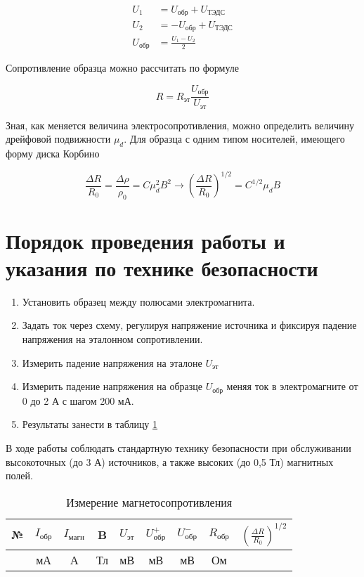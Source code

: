 \begin{equation}
\begin{split}
U_{1} &= U_{\text{обр}} + U_{\text{ТЭДС}} \\
U_{2} &= - U_{\text{обр}} + U_{\text{ТЭДС}} \\
U_{\text{обр}} &= \frac{U_{1} - U_{2}}{2}
\end {split}
\end{equation}

Сопротивление образца можно рассчитать по формуле

\begin{equation}
R = R_{\text{эт}} \frac{U_{\text{обр}}}{U_{\text{эт}}}
\end{equation}

Зная, как меняется величина электросопротивления, можно определить величину дрейфовой подвижности $\mu_{d}$. Для образца с одним типом носителей, имеющего форму диска Корбино

\begin{equation}
\frac{\Delta R}{R_{0}} = \frac{\Delta \rho}{\rho_{0}} = C \mu_{d}^2 B^2 \rightarrow
\left( \frac{\Delta R}{R_{0}} \right)^{1/2} = C^{1/2} \mu_{d} B
\label{eq5_muB}
\end{equation}

\section{Порядок проведения работы и указания по технике безопасности}

\begin{enumerate}
\item Установить образец между полюсами электромагнита.
\item Задать ток через схему, регулируя напряжение источника и фиксируя падение напряжения на эталонном сопротивлении.
\item Измерить падение напряжения на эталоне $U_{\text{эт}}$
\item Измерить падение напряжения на образце $U_{\text{обр}}$ меняя ток в электромагните от 0 до 2 А с шагом 200 мА.
\item Результаты занести в таблицу \ref{5_table}
\end{enumerate}

В ходе работы соблюдать стандартную технику безопасности при обслуживании высокоточных (до 3 А) источников, а также высоких (до 0,5 Тл) магнитных полей.

\begin{table}[h!]
\caption{Измерение магнетосопротивления}
\begin{center}
\begin{tabular}{c|c|c|c|c|c|c|c|c}
№ & $I_{\text{обр}}$ & $I_{\text{магн}}$ & B & $U_{\text{эт}}$ & $U_{\text{обр}}^{+}$ & $U_{\text{обр}}^{-}$ & $R_{\text{обр}}$ & $\left( \frac{\Delta R}{R_{0}} \right)^{1/2}$ \\
\hline
& мА & А & Тл & мВ & мВ & мВ & Ом & \\
\hline
\end{tabular}
\end{center}
\label{5_table}
\end{table}

